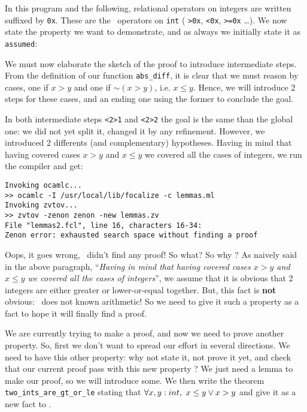 \documentclass[11pt,a4paper,twoside,onecolumn,fullpage]{article}
\begin{document}
In this program and the following, relational operators on integers
are written suffixed by \lstinline{0x}. These are the \focal\
operators on \lstinline{int} ( \lstinline{>0x}, \lstinline{<0x},
\lstinline{>=0x} \ldots). We now state the property we want to
demonstrate, and as always we initially state it as \lstinline{assumed}:

{\scriptsize
}

We must now elaborate the sketch of the proof to introduce
intermediate steps. From the definition of our function
\lstinline"abs_diff", it is clear that we must reason by cases, one if
$x > y$ and one if $\sim (x > y)$, i.e. $x \le y$. Hence, we will
introduce 2 steps for these cases, and an ending one using the former
to conclude the goal.

{\scriptsize
}

In both intermediate steps \lstinline"<2>1" and \lstinline"<2>2" the
goal is the same than the global one: we did not yet split it, changed
it by any refinement. However, we introduced 2 differents (and
complementary) hypotheses.
Having in mind that having covered cases $x > y$
and  $x \le y$ we covered all the cases of integers, we run the
compiler and get:

{\scriptsize
\begin{verbatim}
Invoking ocamlc...
>> ocamlc -I /usr/local/lib/focalize -c lemmas.ml
Invoking zvtov...
>> zvtov -zenon zenon -new lemmas.zv
File "lemmas2.fcl", line 16, characters 16-34:
Zenon error: exhausted search space without finding a proof
\end{verbatim}}

Oops, it goes wrong, \zenon\ didn't find any proof! So what? So why ?
As naively said in the above paragraph, ``{\em Having in mind that having
covered cases $x > y$ and  $x \le y$ we covered all the cases of
integers}'', we assume that it is obvious that 2 integers are either
greater or lower-or-equal together. But, this fact is {\bf not}
obvious: \zenon\ does not known arithmetic! So we need to give it
such a property as a fact to hope it will finally find a proof.

\medskip
We are currently trying to make a proof, and now we need to prove
another property. So, first we don't want to spread our effort in
several directions. We need to have this other property: why not state
it, not prove it yet, and check that our current proof pass with this
new property ? We just need a lemma to make our proof, so we will
introduce some. We then write the theorem
\lstinline"two_ints_are_gt_or_le"
stating that $\forall x, y : int,\ x \le y \vee x > y$ and give it
as a new fact to \zenon.
\end{document}
